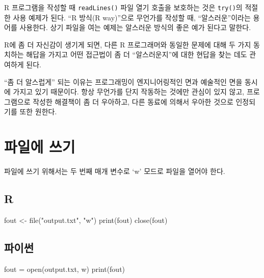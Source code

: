 \documentclass[
  letterpaper,
]{book}
\newenvironment{Shaded}{\begin{snugshade}}{\end{snugshade}}
\newcommand{\BuiltInTok}[1]{\textcolor[rgb]{0.00,0.23,0.31}{#1}}
\newcommand{\FunctionTok}[1]{\textcolor[rgb]{0.28,0.35,0.67}{#1}}
\newcommand{\NormalTok}[1]{\textcolor[rgb]{0.00,0.23,0.31}{#1}}
\newcommand{\OperatorTok}[1]{\textcolor[rgb]{0.37,0.37,0.37}{#1}}
\newcommand{\OtherTok}[1]{\textcolor[rgb]{0.00,0.23,0.31}{#1}}
\newcommand{\StringTok}[1]{\textcolor[rgb]{0.13,0.47,0.30}{#1}}
\begin{document}
R 프로그램을 작성할 때 \texttt{readLines()} 파일 열기 호출을 보호하는
것은 \texttt{try()}의 적절한 사용 예제가 된다. ``R 방식(R way)''으로
무언가를 작성할 때, ``알스러운''이라는 용어를 사용한다. 상기 파일을 여는
예제는 알스러운 방식의 좋은 예가 된다고 말한다.

R에 좀 더 자신감이 생기게 되면, 다른 R 프로그래머와 동일한 문제에 대해
두 가지 동치하는 해답을 가지고 어떤 접근법이 좀 더 ``알스러운지''에 대한
현답을 찾는 데도 관여하게 된다.

``좀 더 알스럽게'' 되는 이유는 프로그래밍이 엔지니어링적인 면과 예술적인
면을 동시에 가지고 있기 때문이다. 항상 무언가를 단지 작동하는 것에만
관심이 있지 않고, 프로그램으로 작성한 해결책이 좀 더 우아하고, 다른
동료에 의해서 우아한 것으로 인정되기를 또한 원한다.

\section{파일에 쓰기}\label{r-file-write}


파일에 쓰기 위해서는 두 번째 매개 변수로 `w' 모드로 파일을 열어야 한다.

\subsection*{R}\label{r-39}

\begin{Shaded}
\begin{Highlighting}[]
\NormalTok{fout }\OtherTok{\textless{}{-}} \FunctionTok{file}\NormalTok{(}\StringTok{"output.txt"}\NormalTok{, }\StringTok{"w"}\NormalTok{)}
\FunctionTok{print}\NormalTok{(fout)}
\FunctionTok{close}\NormalTok{(fout)}
\end{Highlighting}
\end{Shaded}

\subsection*{파이썬}\label{uxd30cuxc774uxc36c-39}

\begin{Shaded}
\begin{Highlighting}[]
\NormalTok{fout }\OperatorTok{=} \BuiltInTok{open}\NormalTok{(}\StringTok{\textquotesingle{}output.txt\textquotesingle{}}\NormalTok{, }\StringTok{\textquotesingle{}w\textquotesingle{}}\NormalTok{)}
\BuiltInTok{print}\NormalTok{(fout)}
\end{Highlighting}
\end{Shaded}
\end{document}
